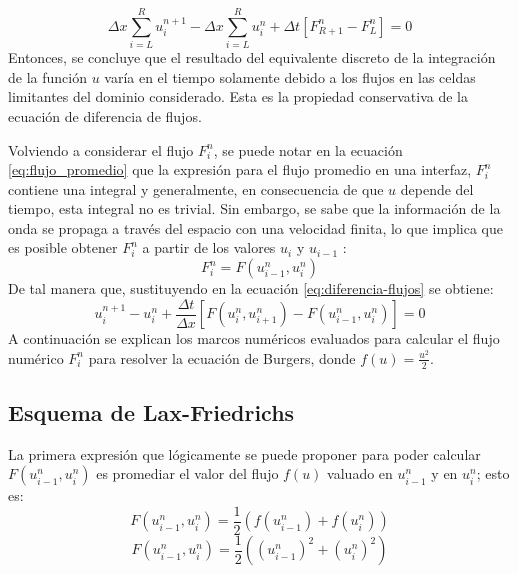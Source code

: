 \documentclass[12pt]{article}
\begin{document}
	\begin{equation}
		{\Delta x}\sum_{i=L}^{R} u_{i}^{n+1} - {\Delta x}\sum_{i=L}^{R}  u_{i}^{n} + {\Delta t}\left[ F_{R+1}^{n} - F_{L}^{n} \right] =0
	\end{equation}
	Entonces, se concluye que el resultado del equivalente discreto de la integración de la función $u$ varía en el tiempo solamente debido a los flujos en las celdas limitantes del dominio considerado. Esta es la propiedad conservativa de la ecuación de diferencia de flujos.
	
	Volviendo a considerar el flujo $F_{i}^{n}$, se puede notar en la ecuación \ref{eq:flujo_promedio} que la expresión para el flujo promedio en una interfaz, $F_{i}^{n}$ contiene una integral y generalmente, en consecuencia de que $u$ depende del tiempo, esta integral no es trivial. Sin embargo, se sabe que la información de la onda se propaga a través del espacio con una velocidad finita, lo que implica que es posible obtener $F_{i}^{n}$ a partir de los valores $u_i$ y $u_{i-1}$ \cite{LeVeque1998}:
	\begin{equation}
		F_{i}^{n} = F(u_{i-1}^{n}, u_{i}^{n})
	\end{equation}
	De tal manera que, sustituyendo en la ecuación \ref{eq:diferencia-flujos} se obtiene:
	\begin{equation}
		u_{i}^{n+1} - u_{i}^{n} + \frac{\Delta t}{\Delta x}\left[ F(u_{i}^{n}, u_{i+1}^{n}) - F(u_{i-1}^{n}, u_{i}^{n})\right] = 0
		\label{eq:flux-diff}
	\end{equation}
	A continuación se explican los marcos numéricos evaluados para calcular el flujo numérico $F_{i}^{n}$ para resolver la ecuación de Burgers, donde $f(u)=\frac{u^2}{2}$.
	
	\subsection{Esquema de Lax-Friedrichs}
	La primera expresión que lógicamente se puede proponer para poder calcular $F(u_{i-1}^{n}, u_{i}^{n})$ es promediar el valor del flujo $f(u)$ valuado en $u_{i-1}^{n}$ y en $u_{i}^{n}$; esto es:
	\begin{equation}
		F(u_{i-1}^{n}, u_{i}^{n}) = \frac{1}{2} \left( f(u_{i-1}^{n}) + f(u_{i}^{n})\right) 
	\end{equation}
	\begin{equation}
		F(u_{i-1}^{n}, u_{i}^{n}) = \frac{1}{2} \left( (u_{i-1}^{n})^2 + (u_{i}^{n})^2 \right) 
	\end{equation}
	
\end{document}
